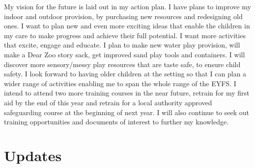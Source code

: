 \documentclass[10pt,a4paper]{report}
\begin{document}
My vision for the future is laid out in my action plan. I have plans to improve my indoor and outdoor provision, by purchasing new resources and redesigning old ones. I want to plan new and even more exciting ideas that enable the children in my care to make progress and achieve their full potential. I want more activities that excite, engage and educate. I plan to make new water play provision, will make a Dear Zoo story sack, get improved sand play tools and containers. I will discover more sensory/messy play resources that are taste safe, to ensure child safety. I look forward to having older children at the setting so that I can plan a wider range of activities enabling me to span the whole range of the EYFS. I intend to attend two more training courses in the near future, retrain for my first aid by the end of this year and retrain for a local authority approved safeguarding course at the beginning of next year. I will also continue to seek out training opportunities and documents of interest to further my knowledge.

\section{Updates}
\end{document}
